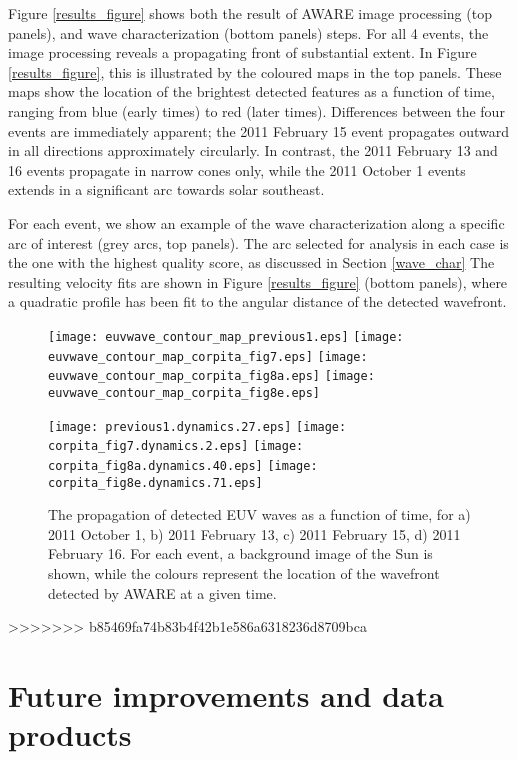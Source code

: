 \documentclass[referee,a4paper,12pt,traditabstract]{swsc}
\begin{document}
\begin{linenumbers}
Figure \ref{results_figure} shows both the result of AWARE image processing (top panels), and wave characterization (bottom panels) steps. For all 4 events, the image processing reveals a propagating front of substantial extent. In Figure \ref{results_figure}, this is illustrated by the coloured maps in the top panels. These maps show the location of the brightest detected features as a function of time, ranging from blue (early times) to red (later times). Differences between the four events are immediately apparent; the 2011 February 15 event propagates outward in all directions approximately circularly. In contrast, the 2011 February 13 and 16 events propagate in narrow cones only, while the 2011 October 1 events extends in a significant arc towards solar southeast. 

For each event, we show an example of the wave characterization along a specific arc of interest (grey arcs, top panels). The arc selected for analysis in each case is the one with the highest quality score, as discussed in Section \ref{wave_char} The resulting velocity fits are shown in Figure \ref{results_figure} (bottom panels), where a quadratic profile has been fit to the angular distance of the detected wavefront. 

\begin{figure}
\begin{center}
\texttt{[image: euvwave\_contour\_map\_previous1.eps]}
\texttt{[image: euvwave\_contour\_map\_corpita\_fig7.eps]}
\texttt{[image: euvwave\_contour\_map\_corpita\_fig8a.eps]}
\texttt{[image: euvwave\_contour\_map\_corpita\_fig8e.eps]}

\texttt{[image: previous1.dynamics.27.eps]}
\texttt{[image: corpita\_fig7.dynamics.2.eps]}
\texttt{[image: corpita\_fig8a.dynamics.40.eps]}
\texttt{[image: corpita\_fig8e.dynamics.71.eps]}
\caption{The propagation of detected EUV waves as a function of time, for a) 2011 October 1, b) 2011 February 13, c) 2011 February 15, d) 2011 February 16. For each event, a background image of the Sun is shown, while the colours represent the location of the wavefront detected by AWARE at a given time.}
\end{center}
\end{figure}




>>>>>>> b85469fa74b83b4f42b1e586a6318236d8709bca

\section{Future improvements and data products}\label{sec:future}


\end{linenumbers}
\end{document}
